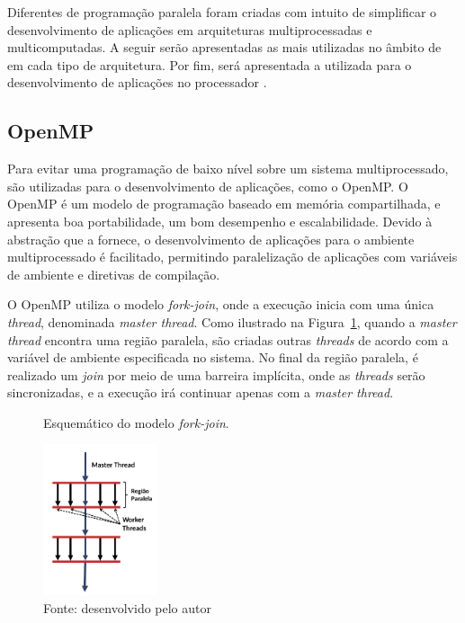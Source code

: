 Diferentes \apis de programação paralela foram criadas com intuito de simplificar
o desenvolvimento de aplicações em arquiteturas multiprocessadas e multicomputadas.
A seguir serão apresentadas as \apis mais utilizadas no âmbito de \hpc em cada tipo de
arquitetura. Por fim, será apresentada a \api utilizada para o desenvolvimento de aplicações
no processador \mppa.


\subsection{OpenMP}

%


Para evitar uma programação de baixo nível sobre um sistema multiprocessado, são
utilizadas \apis para o desenvolvimento de aplicações, como o OpenMP. O OpenMP
é um modelo de programação baseado em memória compartilhada, e apresenta boa
portabilidade, um bom desempenho e escalabilidade. Devido à abstração que a \api
fornece, o desenvolvimento de aplicações para o ambiente multiprocessado é
facilitado, permitindo paralelização de aplicações com variáveis de ambiente e
diretivas de compilação.

O OpenMP utiliza o modelo \textit{fork-join}, onde a execução inicia com uma
única \textit{thread}, denominada \textit{master thread}. Como ilustrado na
Figura~\ref{fig:forkjoin}, quando a \textit{master thread} encontra
uma região paralela, são criadas outras \textit{threads} de acordo com a variável
de ambiente especificada no sistema. No final da região paralela, é realizado um
\textit{join} por meio de uma barreira implícita, onde as \textit{threads} serão
sincronizadas, e a execução irá continuar apenas com a \textit{master thread}.

\begin{figure}[t]
	\centering
	\caption{Esquemático do modelo \textit{fork-join}.}
	\includegraphics[width=0.3\textwidth]{figs/forkjoin.pdf}
    \caption*{Fonte: desenvolvido pelo autor}
	\label{fig:forkjoin}
\end{figure}

